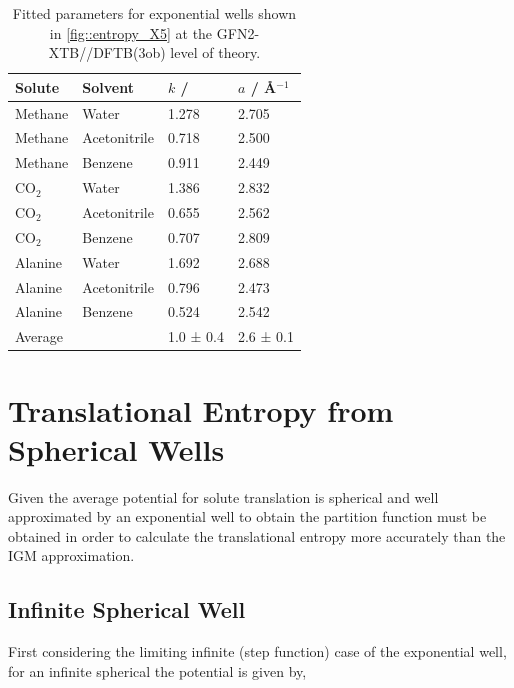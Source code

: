\documentclass[../main.tex]{subfiles}
\begin{document}
\begin{table}[h!]
	\renewcommand{\arraystretch}{1.5}
	\begin{center}
		\small
		\begin{tabularx}{\textwidth}{YYYY} 
			\toprule
			Solute & Solvent& $k$ / \kcal & $a$ / \AA$^{-1}$ \\
			\hline
			Methane  & Water &   1.278    &   2.705     \\
			Methane  & Acetonitrile &   0.718    &   2.500    \\
			Methane  & Benzene &   0.911    &    2.449    \\
			CO$_2$  & Water&   1.386    &    2.832     \\
			CO$_2$  & Acetonitrile&   0.655    &    2.562   \\
			CO$_2$  & Benzene &    0.707   &    2.809   \\
			Alanine   &Water &     1.692  &    2.688     \\
			Alanine   & Acetonitrile&   0.796    &    2.473   \\
			Alanine   & Benzene &   0.524   &   2.542    \\
			\hline
			Average && 1.0 ± 0.4 & 2.6 ± 0.1 \\
			\bottomrule
		\end{tabularx}
	\end{center}
	\caption{Fitted parameters for exponential wells shown in \figurename{ \ref{fig::entropy_X5}} at the GFN2-XTB//DFTB(3ob) level of theory.} 
	\label{table::figX5_params}
\end{table}

\newpage
\section{Translational Entropy from Spherical Wells}
Given the average potential for solute translation is spherical and well approximated by an exponential well to obtain the partition function must be obtained in order to calculate the translational entropy more accurately than the IGM approximation. 

\subsection{Infinite Spherical Well}

First considering the limiting infinite (step function) case of the exponential well, for an infinite spherical the potential is given by,
\end{document}
